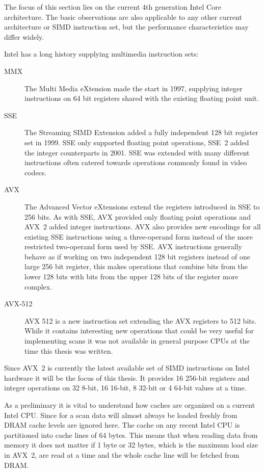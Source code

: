 The focus of this section lies on the current 4th generation Intel Core
architecture. The basic observations are also applicable to any other current
architecture or SIMD instruction set, but the performance characteristics may
differ widely.

Intel has a long history supplying multimedia instruction sets:
\begin{description}
\item[MMX] The Multi Media eXtension made the start in 1997, supplying integer
instructions on 64 bit registers shared with the existing floating point unit.
\item[SSE] The Streaming SIMD Extension added a fully independent 128 bit
register set in 1999. SSE only supported floating point operations, SSE~2 added
the integer counterparts in 2001. SSE was extended with many different
instructions often catered towards operations commonly found in video codecs.
\item[AVX] The Advanced Vector eXtensions extend the registers introduced in
SSE to 256 bits. As with SSE, AVX provided only floating point operations and
AVX~2 added integer instructions. AVX also provides new encodings for all
existing SSE instructions using a three-operand form instead of the more
restricted two-operand form used by SSE. AVX instructions generally behave as
if working on two independent 128 bit registers instead of one large 256 bit
register, this makes operations that combine bits from the lower 128 bits with
bits from the upper 128 bits of the register more complex.
\item[AVX-512] AVX 512 is a new instruction set extending the AVX registers to
512 bits. While it contains interesting new operations that could be very
useful for implementing scans it was not available in general purpose CPUs at
the time this thesis was written.
\end{description}

Since AVX~2 is currently the latest available set of SIMD instructions on Intel
hardware it will be the focus of this thesis. It provides 16 256-bit registers
and integer operations on 32 8-bit, 16 16-bit, 8 32-bit or 4 64-bit values at a
time.

As a preliminary it is vital to understand how caches are organized on a
current Intel CPU. Since for a scan data will almost always be loaded freshly
from DRAM cache levels are ignored here. The cache on any recent Intel CPU is
partitioned into cache lines of 64 bytes. This means that when reading data
from memory it does not matter if 1 byte or 32 bytes, which is the maximum load
size in AVX~2, are read at a time and the whole cache line will be fetched from
DRAM.

